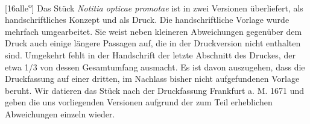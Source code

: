 [16alle\textsuperscript{o}] Das St\"{u}ck \textit{Notitia opticae promotae} ist in zwei Versionen \"{u}berliefert, als handschriftliches Konzept und als Druck. Die handschriftliche Vorlage wurde mehrfach umgearbeitet. Sie weist neben kleineren Abweichungen gegen\"{u}ber dem Druck auch einige l\"{a}ngere Passagen auf, die in der Druckversion nicht enthalten sind. Umgekehrt fehlt in der Handschrift der letzte Abschnitt des Druckes, der etwa 1/3 von dessen Gesamtumfang ausmacht. Es ist davon auszugehen, dass die Druckfassung auf einer dritten, im Nachlass bisher nicht aufgefundenen Vorlage beruht. Wir datieren das St\"{u}ck nach der Druckfassung Frankfurt a. M. 1671 und geben die uns vorliegenden Versionen aufgrund der zum Teil erheblichen Abweichungen einzeln wieder.